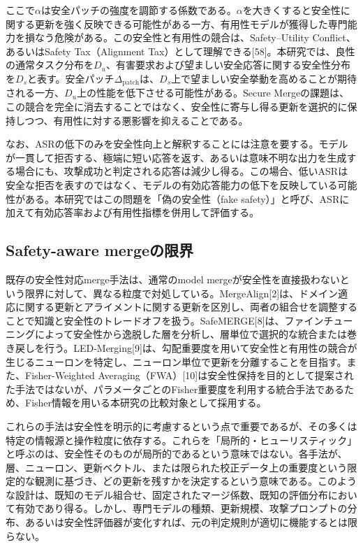 \documentclass{article}
\begin{document}
ここで\(\alpha\)は安全パッチの強度を調節する係数である。\(\alpha\)を大きくすると安全性に関する更新を強く反映できる可能性がある一方、有用性モデルが獲得した専門能力を損なう危険がある。この安全性と有用性の競合は、Safety--Utility Conflict、あるいはSafety Tax（Alignment Tax）として理解できる[58]。本研究では、良性の通常タスク分布を\(D_u\)、有害要求および望ましい安全応答に関する安全性分布を\(D_s\)と表す。安全パッチ\(\Delta_{\mathrm{patch}}\)は、\(D_s\)上で望ましい安全挙動を高めることが期待される一方、\(D_u\)上の性能を低下させる可能性がある。Secure Mergeの課題は、この競合を完全に消去することではなく、安全性に寄与し得る更新を選択的に保持しつつ、有用性に対する悪影響を抑えることである。

なお、ASRの低下のみを安全性向上と解釈することには注意を要する。モデルが一貫して拒否する、極端に短い応答を返す、あるいは意味不明な出力を生成する場合にも、攻撃成功と判定される応答は減少し得る。この場合、低いASRは安全な拒否を表すのではなく、モデルの有効応答能力の低下を反映している可能性がある。本研究ではこの問題を「偽の安全性（fake safety）」と呼び、ASRに加えて有効応答率および有用性指標を併用して評価する。

\subsection{Safety-aware mergeの限界}
既存の安全性対応merge手法は、通常のmodel mergeが安全性を直接扱わないという限界に対して、異なる粒度で対処している。MergeAlign[2]は、ドメイン適応に関する更新とアライメントに関する更新を区別し、両者の組合せを調整することで知識と安全性のトレードオフを扱う。SafeMERGE[8]は、ファインチューニングによって安全性から逸脱した層を分析し、層単位で選択的な統合または巻き戻しを行う。LED-Merging[9]は、勾配重要度を用いて安全性と有用性の競合が生じるニューロンを特定し、ニューロン単位で更新を分離することを目指す。また、Fisher-Weighted Averaging（FWA）[10]は安全性保持を目的として提案された手法ではないが、パラメータごとのFisher重要度を利用する統合手法であるため、Fisher情報を用いる本研究の比較対象として採用する。

これらの手法は安全性を明示的に考慮するという点で重要であるが、その多くは特定の情報源と操作粒度に依存する。これらを「局所的・ヒューリスティック」と呼ぶのは、安全性そのものが局所的であるという意味ではない。各手法が、層、ニューロン、更新ベクトル、または限られた校正データ上の重要度という限定的な観測に基づき、どの更新を残すかを決定するという意味である。このような設計は、既知のモデル組合せ、固定されたマージ係数、既知の評価分布において有効であり得る。しかし、専門モデルの種類、更新規模、攻撃プロンプトの分布、あるいは安全性評価器が変化すれば、元の判定規則が適切に機能するとは限らない。
\end{document}
